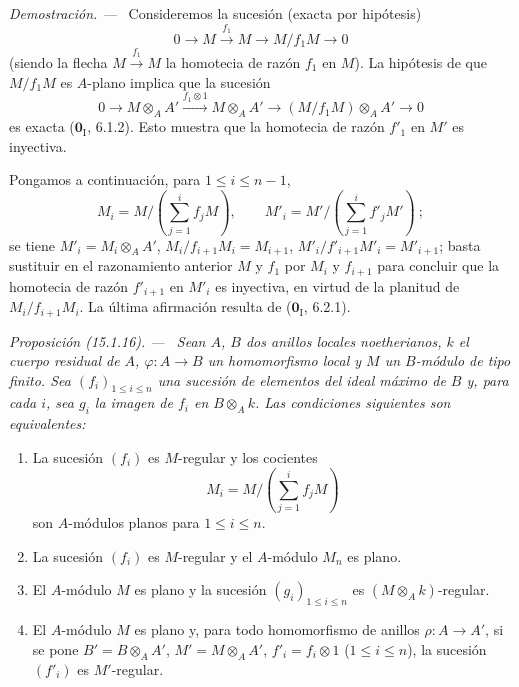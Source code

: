 \documentclass[10pt,oneside]{book}
\makeatletter
\newcommand{\setmanualcurrentlabel}[1]{\def\@currentlabel{#1}}
\newcommand{\oldpage}[2][]{%
  \setcounter{footnote}{0}%
  \marginpar{\scriptsize\textbf{#1}~|~#2}\ignorespaces}
\newenvironment{proposition}[1][]{%
  \setmanualcurrentlabel{#1}\par\medskip\noindent\itshape Proposición (#1). ---\ }{\par}
\newenvironment{proof}{%
  \par\medskip\noindent\textit{Demostración. ---\ }}{\par}
\makeatother
\begin{document}
\begin{proof}
Consideremos la sucesión (exacta por hipótesis)
\[
  0\longrightarrow M\xrightarrow{f_1}M\longrightarrow M/f_1M
  \longrightarrow0
\]
(siendo la flecha $M\xrightarrow{f_1}M$ la homotecia de razón $f_1$ en
$M$). La hipótesis de que $M/f_1M$ es $A$-plano implica que la sucesión
\[
  0\longrightarrow M\otimes_A A'
  \xrightarrow{f_1\otimes1}M\otimes_A A'
  \longrightarrow(M/f_1M)\otimes_A A'\longrightarrow0
\]
\oldpage[0\textsubscript{IV-1}]{18}
es exacta ($\mathbf{0}_{\mathrm I}$, 6.1.2). Esto muestra que la homotecia de razón
$f'_1$ en $M'$ es inyectiva.

Pongamos a continuación, para $1\leq i\leq n-1$,
\[
  M_i=M/\left(\sum_{j=1}^i f_jM\right),\qquad
  M'_i=M'/\left(\sum_{j=1}^i f'_jM'\right)~;
\]
se tiene $M'_i=M_i\otimes_A A'$, $M_i/f_{i+1}M_i=M_{i+1}$,
$M'_i/f'_{i+1}M'_i=M'_{i+1}$; basta sustituir en el razonamiento anterior
$M$ y $f_1$ por $M_i$ y $f_{i+1}$ para concluir que la homotecia de razón
$f'_{i+1}$ en $M'_i$ es inyectiva, en virtud de la planitud de
$M_i/f_{i+1}M_i$. La última afirmación resulta de ($\mathbf{0}_{\mathrm I}$, 6.2.1).
\end{proof}
\begin{proposition}[15.1.16]
\label{0.15.1.16-es}
Sean $A$, $B$ dos anillos locales noetherianos, $k$ el cuerpo residual de
$A$, $\varphi:A\to B$ un homomorfismo local y $M$ un $B$-módulo de tipo finito.
Sea $(f_i)_{1\leq i\leq n}$ una sucesión de elementos del ideal máximo de $B$
y, para cada $i$, sea $g_i$ la imagen de $f_i$ en $B\otimes_A k$. Las
condiciones siguientes son equivalentes:
\begin{enumerate}
  \item[\textup{a)}] La sucesión $(f_i)$ es $M$-regular y los cocientes
  \[
    M_i=M/\left(\sum_{j=1}^i f_jM\right)
  \]
  son $A$-módulos planos para $1\leq i\leq n$.
  \item[\textup{b)}] La sucesión $(f_i)$ es $M$-regular y el $A$-módulo $M_n$ es
  plano.
  \item[\textup{c)}] El $A$-módulo $M$ es plano y la sucesión
  $(g_i)_{1\leq i\leq n}$ es $(M\otimes_A k)$-regular.
  \item[\textup{d)}] El $A$-módulo $M$ es plano y, para todo homomorfismo de
  anillos $\rho:A\to A'$, si se pone $B'=B\otimes_A A'$,
  $M'=M\otimes_A A'$, $f'_i=f_i\otimes1$ \textup{($1\leq i\leq n$)}, la sucesión
  $(f'_i)$ es $M'$-regular.
\end{enumerate}
\end{proposition}
\end{document}
